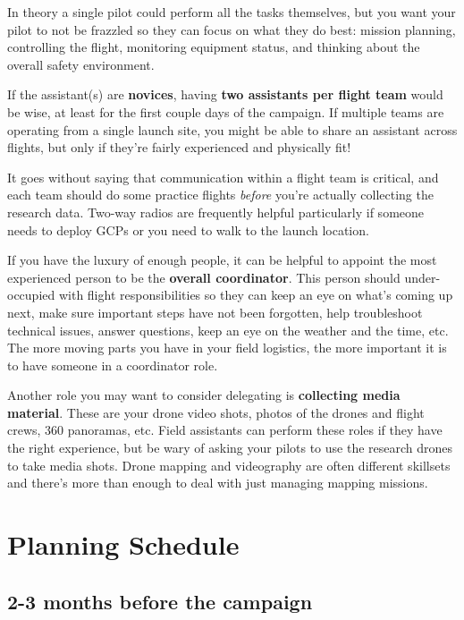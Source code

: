\documentclass[
]{book}
\begin{document}
In theory a single pilot could perform all the tasks themselves, but you want your pilot to not be frazzled so they can focus on what they do best: mission planning, controlling the flight, monitoring equipment status, and thinking about the overall safety environment.

If the assistant(s) are \textbf{novices}, having \textbf{two assistants per flight team} would be wise, at least for the first couple days of the campaign. If multiple teams are operating from a single launch site, you might be able to share an assistant across flights, but only if they're fairly experienced and physically fit!

It goes without saying that communication within a flight team is critical, and each team should do some practice flights \emph{before} you're actually collecting the research data. Two-way radios are frequently helpful particularly if someone needs to deploy GCPs or you need to walk to the launch location.

If you have the luxury of enough people, it can be helpful to appoint the most experienced person to be the \textbf{overall coordinator}. This person should under-occupied with flight responsibilities so they can keep an eye on what's coming up next, make sure important steps have not been forgotten, help troubleshoot technical issues, answer questions, keep an eye on the weather and the time, etc. The more moving parts you have in your field logistics, the more important it is to have someone in a coordinator role.

Another role you may want to consider delegating is \textbf{collecting media material}. These are your drone video shots, photos of the drones and flight crews, 360 panoramas, etc. Field assistants can perform these roles if they have the right experience, but be wary of asking your pilots to use the research drones to take media shots. Drone mapping and videography are often different skillsets and there's more than enough to deal with just managing mapping missions.

\hypertarget{planning-schedule}{%
\section{Planning Schedule}\label{planning-schedule}}

\hypertarget{months-before-the-campaign}{%
\subsection{2-3 months before the campaign}\label{months-before-the-campaign}}
\end{document}
